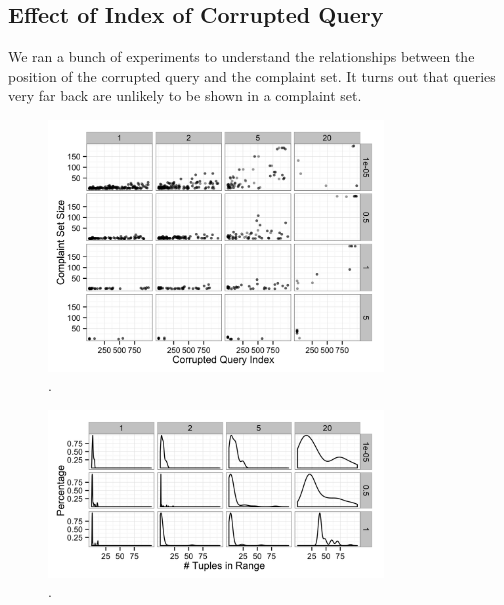 \subsection{Effect of Index of Corrupted Query}

We ran a bunch of experiments to understand the relationships between the position of the corrupted query
and the complaint set.  It turns out that queries very far back are unlikely to be shown in a complaint set.


  \begin{figure}[h]
  \centering
  \includegraphics[width = 3.5in]{figures/qidxsimulation/qidx_v_ncomplaints}
  \caption{.}
  \label{f:qidx_v_ncomplaints} 
  \end{figure}


  \begin{figure}[h]
  \centering
  \includegraphics[width = 3.5in]{figures/qidxsimulation/numinrange}
  \caption{.}
  \label{f:numinrange} 
  \end{figure}





















